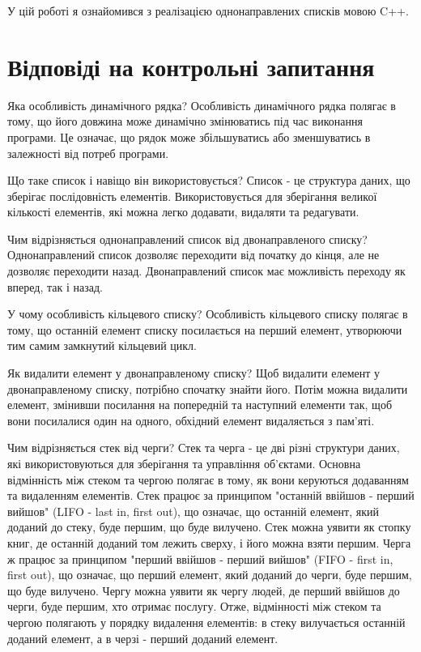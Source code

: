 \documentclass[a4paper, 12pt, oneside]{extarticle}
\begin{document}
У цій роботі я ознайомився з реалізацією однонаправлених
списків мовою C++.

\section*{Відповіді на контрольні запитання}
\begin{itemize}
	\question Яка особливість динамічного рядка?
	\answer Особливість динамічного рядка полягає в тому, що його довжина може динамічно змінюватись під час виконання програми. Це означає, що рядок може збільшуватись або зменшуватись в залежності від потреб програми.

	\question Що таке список і навіщо він використовується?
	\answer Список - це структура даних, що зберігає послідовність елементів. Використовується для зберігання великої кількості елементів, які можна легко додавати, видаляти та редагувати.

	\question  Чим відрізняється однонаправлений список від двонаправленого списку?
	\answer Однонаправлений список дозволяє переходити від початку до кінця, але не дозволяє переходити назад. Двонаправлений список має можливість переходу як вперед, так і назад.

	\question У чому особливість кільцевого списку?
	\answer Особливість кільцевого списку полягає в тому, що останній елемент списку посилається на перший елемент, утворюючи тим самим замкнутий кільцевий цикл.

	\question  Як видалити елемент у двонаправленому списку?
	\answer Щоб видалити елемент у двонаправленому списку, потрібно спочатку знайти його. Потім можна видалити елемент, змінивши посилання на попередній та наступний елементи так, щоб вони посилалися один на одного, обхідний елемент видаляється з пам'яті.

	\question  Чим відрізняється стек від черги?
	\answer Стек та черга - це дві різні структури даних, які використовуються для зберігання та управління об'єктами.
Основна відмінність між стеком та чергою полягає в тому, як вони керуються додаванням та видаленням елементів.
Стек працює за принципом "останній ввійшов - перший вийшов" (LIFO - last in, first out), що означає, що останній елемент, який доданий до стеку, буде першим, що буде вилучено. Стек можна уявити як стопку книг, де останній доданий том лежить сверху, і його можна взяти першим.
Черга ж працює за принципом "перший ввійшов - перший вийшов" (FIFO - first in, first out), що означає, що перший елемент, який доданий до черги, буде першим, що буде вилучено. Чергу можна уявити як чергу людей, де перший ввійшов до черги, буде першим, хто отримає послугу.
Отже, відмінності між стеком та чергою полягають у порядку видалення елементів: в стеку вилучається останній доданий елемент, а в черзі - перший доданий елемент.
\end{itemize}
\end{document}
